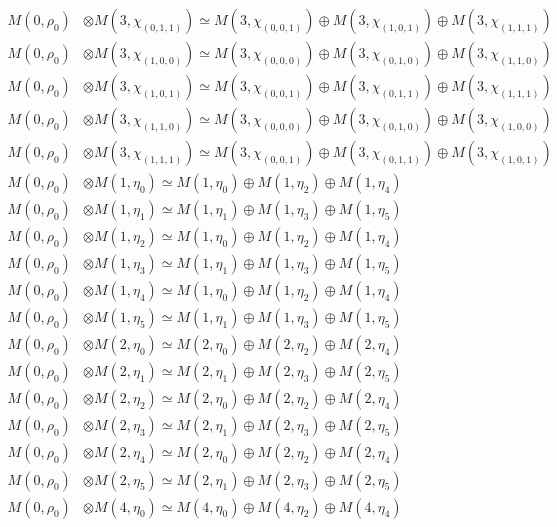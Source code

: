 \begin{align*}
M(0,\rho_{0}) &\otimes M(3,\chi_{(0,1,1)}) \simeq M(3,\chi_{(0,0,1)}) \oplus M(3,\chi_{(1,0,1)}) \oplus M(3,\chi_{(1,1,1)}) \\
M(0,\rho_{0}) &\otimes M(3,\chi_{(1,0,0)}) \simeq M(3,\chi_{(0,0,0)}) \oplus M(3,\chi_{(0,1,0)}) \oplus M(3,\chi_{(1,1,0)}) \\
M(0,\rho_{0}) &\otimes M(3,\chi_{(1,0,1)}) \simeq M(3,\chi_{(0,0,1)}) \oplus M(3,\chi_{(0,1,1)}) \oplus M(3,\chi_{(1,1,1)}) \\
M(0,\rho_{0}) &\otimes M(3,\chi_{(1,1,0)}) \simeq M(3,\chi_{(0,0,0)}) \oplus M(3,\chi_{(0,1,0)}) \oplus M(3,\chi_{(1,0,0)}) \\
M(0,\rho_{0}) &\otimes M(3,\chi_{(1,1,1)}) \simeq M(3,\chi_{(0,0,1)}) \oplus M(3,\chi_{(0,1,1)}) \oplus M(3,\chi_{(1,0,1)}) \\
M(0,\rho_{0}) &\otimes M(1,\eta_{0}) \simeq M(1,\eta_{0}) \oplus M(1,\eta_{2}) \oplus M(1,\eta_{4}) \\
M(0,\rho_{0}) &\otimes M(1,\eta_{1}) \simeq M(1,\eta_{1}) \oplus M(1,\eta_{3}) \oplus M(1,\eta_{5}) \\
M(0,\rho_{0}) &\otimes M(1,\eta_{2}) \simeq M(1,\eta_{0}) \oplus M(1,\eta_{2}) \oplus M(1,\eta_{4}) \\
M(0,\rho_{0}) &\otimes M(1,\eta_{3}) \simeq M(1,\eta_{1}) \oplus M(1,\eta_{3}) \oplus M(1,\eta_{5}) \\
M(0,\rho_{0}) &\otimes M(1,\eta_{4}) \simeq M(1,\eta_{0}) \oplus M(1,\eta_{2}) \oplus M(1,\eta_{4}) \\
M(0,\rho_{0}) &\otimes M(1,\eta_{5}) \simeq M(1,\eta_{1}) \oplus M(1,\eta_{3}) \oplus M(1,\eta_{5}) \\
M(0,\rho_{0}) &\otimes M(2,\eta_{0}) \simeq M(2,\eta_{0}) \oplus M(2,\eta_{2}) \oplus M(2,\eta_{4}) \\
M(0,\rho_{0}) &\otimes M(2,\eta_{1}) \simeq M(2,\eta_{1}) \oplus M(2,\eta_{3}) \oplus M(2,\eta_{5}) \\
M(0,\rho_{0}) &\otimes M(2,\eta_{2}) \simeq M(2,\eta_{0}) \oplus M(2,\eta_{2}) \oplus M(2,\eta_{4}) \\
M(0,\rho_{0}) &\otimes M(2,\eta_{3}) \simeq M(2,\eta_{1}) \oplus M(2,\eta_{3}) \oplus M(2,\eta_{5}) \\
M(0,\rho_{0}) &\otimes M(2,\eta_{4}) \simeq M(2,\eta_{0}) \oplus M(2,\eta_{2}) \oplus M(2,\eta_{4}) \\
M(0,\rho_{0}) &\otimes M(2,\eta_{5}) \simeq M(2,\eta_{1}) \oplus M(2,\eta_{3}) \oplus M(2,\eta_{5}) \\
M(0,\rho_{0}) &\otimes M(4,\eta_{0}) \simeq M(4,\eta_{0}) \oplus M(4,\eta_{2}) \oplus M(4,\eta_{4}) \\

\end{align*}
